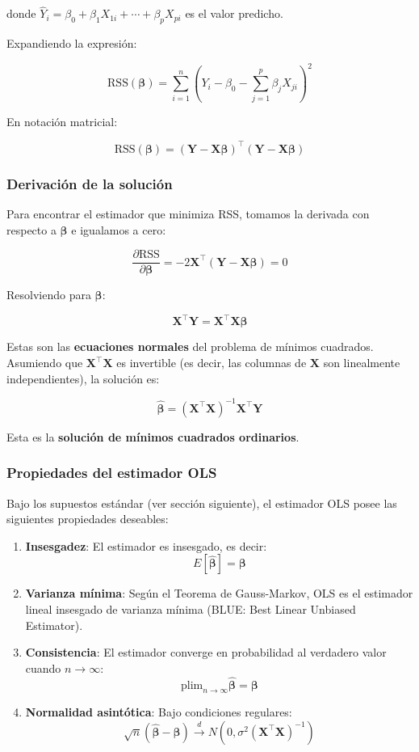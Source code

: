 \documentclass[
  doc,
  floatsintext,
  longtable,
  a4paper,
  nolmodern,
  notxfonts,
  notimes,
  12pt,
  colorlinks=true,linkcolor=blue,citecolor=blue,urlcolor=blue]{apa7}
\begin{document}
donde \(\hat{Y}_i = \beta_0 + \beta_1 X_{1i} + \cdots + \beta_p X_{pi}\)
es el valor predicho.

Expandiendo la expresión:

\[
\text{RSS}(\boldsymbol{\beta}) = \sum_{i=1}^{n} \left(Y_i - \beta_0 - \sum_{j=1}^{p} \beta_j X_{ji}\right)^2
\]

En notación matricial:

\[
\text{RSS}(\boldsymbol{\beta}) = (\mathbf{Y} - \mathbf{X}\boldsymbol{\beta})^\top (\mathbf{Y} - \mathbf{X}\boldsymbol{\beta})
\]

\subsubsection{Derivación de la
solución}\label{derivaciuxf3n-de-la-soluciuxf3n}

Para encontrar el estimador que minimiza RSS, tomamos la derivada con
respecto a \(\boldsymbol{\beta}\) e igualamos a cero:

\[
\frac{\partial \text{RSS}}{\partial \boldsymbol{\beta}} = -2\mathbf{X}^\top(\mathbf{Y} - \mathbf{X}\boldsymbol{\beta}) = 0
\]

Resolviendo para \(\boldsymbol{\beta}\):

\[
\mathbf{X}^\top\mathbf{Y} = \mathbf{X}^\top\mathbf{X}\boldsymbol{\beta}
\]

Estas son las \textbf{ecuaciones normales} del problema de mínimos
cuadrados. Asumiendo que \(\mathbf{X}^\top\mathbf{X}\) es invertible (es
decir, las columnas de \(\mathbf{X}\) son linealmente independientes),
la solución es:

\[
\hat{\boldsymbol{\beta}} = (\mathbf{X}^\top\mathbf{X})^{-1}\mathbf{X}^\top\mathbf{Y}
\]

Esta es la \textbf{solución de mínimos cuadrados ordinarios}.

\subsubsection{Propiedades del estimador
OLS}\label{propiedades-del-estimador-ols}

Bajo los supuestos estándar (ver sección siguiente), el estimador OLS
posee las siguientes propiedades deseables:

\begin{enumerate}
\def\labelenumi{\arabic{enumi}.}
\item
  \textbf{Insesgadez}: El estimador es insesgado, es decir: \[
  E[\hat{\boldsymbol{\beta}}] = \boldsymbol{\beta}
  \]
\item
  \textbf{Varianza mínima}: Según el Teorema de Gauss-Markov, OLS es el
  estimador lineal insesgado de varianza mínima (BLUE: Best Linear
  Unbiased Estimator).
\item
  \textbf{Consistencia}: El estimador converge en probabilidad al
  verdadero valor cuando \(n \to \infty\): \[
  \text{plim}_{n \to \infty} \hat{\boldsymbol{\beta}} = \boldsymbol{\beta}
  \]
\item
  \textbf{Normalidad asintótica}: Bajo condiciones regulares: \[
  \sqrt{n}(\hat{\boldsymbol{\beta}} - \boldsymbol{\beta}) \xrightarrow{d} N(0, \sigma^2(\mathbf{X}^\top\mathbf{X})^{-1})
  \]
\end{enumerate}
\end{document}
